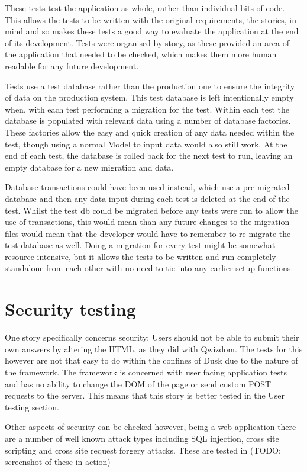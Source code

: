 These tests test the application as whole, rather than individual bits of code. This allows the tests to be written with the original requirements, the stories, in mind and so makes these tests a good way to evaluate the application at the end of its development. Tests were organised by story, as these provided an area of the application that needed to be checked, which makes them more human readable for any future development.

Tests use a test database rather than the production one to ensure the integrity of data on the production system. This test database is left intentionally empty when, with each test performing a migration for the test. Within each test the database is populated with relevant data using a number of database factories. These factories allow the easy and quick creation of any data needed within the test, though using a normal Model to input data would also still work. At the end of each test, the database is rolled back for the next test to run, leaving an empty database for a new migration and data.

Database transactions could have been used instead, which use a pre migrated database and then any data input during each test is deleted at the end of the test. Whilst the test db could be migrated before any tests were run to allow the use of transactions, this would mean than any future changes to the migration files would mean that the developer would have to remember to re-migrate the test database as well. Doing a migration for every test might be somewhat resource intensive, but it allows the tests to be written and run completely standalone from each other with no need to tie into any earlier setup functions. 

\section{Security testing}
One story specifically concerns security: Users should not be able to submit their own answers by altering the HTML, as they did with Qwizdom. The tests for this however are not that easy to do within the confines of Dusk due to the nature of the framework. The framework is concerned with user facing application tests and has no ability to change the DOM of the page or send custom POST requests to the server. This means that this story is better tested in the User testing section.

Other aspects of security can be checked however, being a web application there are a number of well known attack types including SQL injection, cross site scripting and cross site request forgery attacks. These are tested in (TODO: screenshot of these in action)

